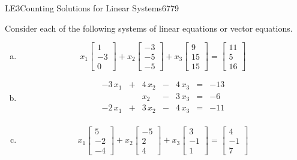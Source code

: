 \begin{exercise}{LE3}{Counting Solutions for Linear Systems}{6779} 
\begin{exerciseStatement} 

 Consider each of the following systems of linear equations or vector equations. 

 

\begin{enumerate}[(a)]
\item  

 \[
              x_{1} \left[\begin{array}{c}
1 \\
-3 \\
0
\end{array}\right] + x_{2} \left[\begin{array}{c}
-3 \\
-5 \\
-5
\end{array}\right] + x_{3} \left[\begin{array}{c}
9 \\
15 \\
15
\end{array}\right] = \left[\begin{array}{c}
11 \\
5 \\
16
\end{array}\right]
            \] 

 
\item  

 \[
              \begin{matrix}
 -3 \, x_{1} &  +  & 4 \, x_{2} &  -  & 4 \, x_{3} & = & -13 \\
 &  & x_{2} &  -  & 3 \, x_{3} & = & -6 \\
 -2 \, x_{1} &  +  & 3 \, x_{2} &  -  & 4 \, x_{3} & = & -11 \\
 \end{matrix}
            \] 

 
\item  

 \[
              x_{1} \left[\begin{array}{c}
5 \\
-2 \\
-4
\end{array}\right] + x_{2} \left[\begin{array}{c}
-5 \\
2 \\
4
\end{array}\right] + x_{3} \left[\begin{array}{c}
3 \\
-1 \\
1
\end{array}\right] = \left[\begin{array}{c}
4 \\
-1 \\
7
\end{array}\right]
            \] 


\end{enumerate}
\end{exerciseStatement}
\end{exercise}
